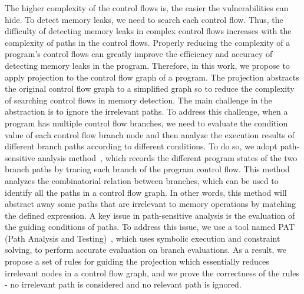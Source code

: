  
The higher complexity of the control flows is, the easier the vulnerabilities can hide. To detect memory leaks, we need to search each control flow. Thus, the difficulty of detecting memory leaks in complex control flows increases with the complexity of paths in the control flows. Properly reducing the complexity of a program’s control flows can greatly improve the efficiency and accuracy of detecting memory leaks in the program. Therefore, in this work, we propose to apply projection to the control flow graph of a program. The projection abstracts the original control flow graph to a simplified graph so to reduce the complexity of searching control flows in memory detection. The main challenge in the abstraction is to ignore the irrelevant paths. To address this challenge, when a program has multiple control flow branches, we need to evaluate the condition value of each control flow branch node and then analyze the execution results of different branch paths according to different conditions. To do so, we adopt path-sensitive analysis method~\cite{XA05}, which records the different program states of the two branch paths by tracing each branch of the program control flow. This method analyzes the combinatorial relation between branches, which can be used to identify all the paths in a control flow graph. In other words, this method will abstract away some paths that are irrelevant to memory operations by matching the defined expression. A key issue in path-sensitive analysis is the evaluation of the guiding conditions of paths. To address this issue, we use a tool named PAT (Path Analysis and Testing)~\cite{H87}, which uses symbolic execution and constraint solving, to perform accurate evaluation on branch evaluations. %
As a result, we propose a set of rules for guiding the projection which essentially reduces irrelevant nodes in a control flow graph, and we prove the correctness of the rules -  no irrelevant path is considered and no relevant path is ignored.



